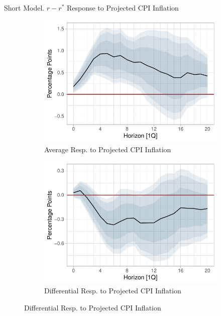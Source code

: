 \documentclass[10pt,aspectratio=169]{beamer}
\begin{document}
\begin{frame}{Short Model. $r-r^*$ Response to Projected CPI Inflation}

    \begin{figure}[!htbp]\centering
        \begin{minipage}{1\textwidth}
            \caption{}
          \begin{subfigure}[b]{0.495\textwidth}
              \centering
              \caption{Average Resp. to Projected CPI Inflation}
              \label{fig:LP_short:average_inflation}
              \includegraphics[width=\linewidth]{average_cpi_inflation_short.pdf}
          \end{subfigure}%
          \begin{subfigure}[b]{0.495\textwidth}
              \centering
              \caption{Differential  Resp. to Projected CPI Inflation}
              \label{fig:LP_short:differential_inflation}
              \includegraphics[width=\linewidth]{differential_cpi_inflation_short.pdf}

\end{subfigure}
\end{minipage}
\end{figure}
\end{frame}
\end{document}
